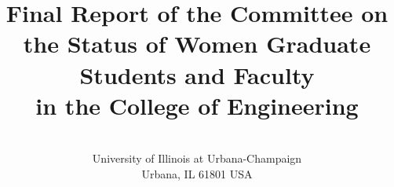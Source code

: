 

\def\subsubsubsection#1{\par\bigskip\noindent{\bf #1}\par\medskip}


\newtheorem{definition}{Definition}[section]
%




\title{\LARGE \bf Final Report of the Committee
 on the Status of Women Graduate Students and Faculty\\
in the College of Engineering} 
\author{%
\vspace*{0.15in}\\
University of Illinois at Urbana-Champaign\\
Urbana, IL 61801 USA\\
}

